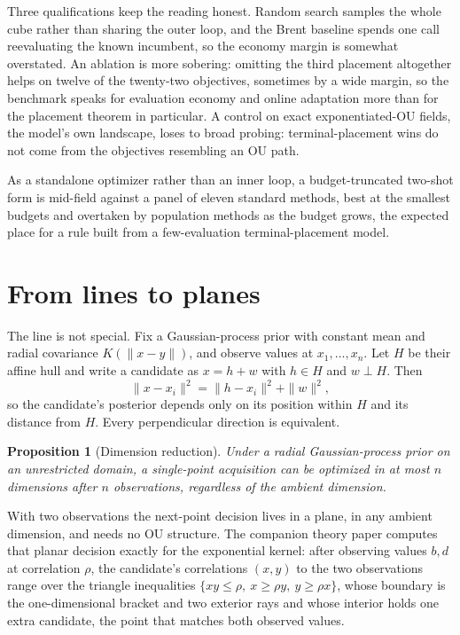 \documentclass[11pt]{article}
\theoremstyle{itheads}
\newtheorem{proposition}{Proposition}
\begin{document}
Three qualifications keep the reading honest. Random search samples the
whole cube rather than sharing the outer loop, and the Brent baseline
spends one call reevaluating the known incumbent, so the economy margin
is somewhat overstated. An ablation is more sobering: omitting the third
placement altogether helps on twelve of the twenty-two objectives,
sometimes by a wide margin, so the benchmark speaks for evaluation
economy and online adaptation more than for the placement theorem in
particular. A control on exact exponentiated-OU fields, the model's own
landscape, loses to broad probing: terminal-placement wins do not
come from the objectives resembling an OU path.

As a standalone optimizer rather than an inner loop, a budget-truncated
two-shot form is mid-field against a panel of eleven standard methods,
best at the smallest budgets and overtaken by population methods as the
budget grows, the expected place for a rule built from a
few-evaluation terminal-placement model.

\section{From lines to planes}

The line is not special. Fix a Gaussian-process prior with constant mean
and radial covariance $K(\|x-y\|)$, and observe values at
$x_1,\dots,x_n$. Let $H$ be their affine hull and write a candidate as
$x=h+w$ with $h\in H$ and $w\perp H$. Then
\begin{equation}
\|x-x_i\|^{2}=\|h-x_i\|^{2}+\|w\|^{2},
\end{equation}
so the candidate's posterior depends only on its position within $H$ and
its distance from $H$. Every perpendicular direction is equivalent.

\begin{proposition}[Dimension reduction]
Under a radial Gaussian-process prior on an unrestricted domain, a
single-point acquisition can be optimized in at most $n$ dimensions
after $n$ observations, regardless of the ambient dimension.
\end{proposition}

With two observations the next-point decision lives in a plane, in any
ambient dimension, and needs no OU structure. The companion theory paper
computes that planar decision exactly for the exponential kernel: after
observing values $b,d$ at correlation $\rho$, the candidate's
correlations $(x,y)$ to the two observations range over the triangle
inequalities $\{xy\le\rho,\ x\ge\rho y,\ y\ge\rho x\}$, whose boundary is
the one-dimensional bracket and two exterior rays and whose interior
holds one extra candidate, the point that matches both observed values.
\end{document}
